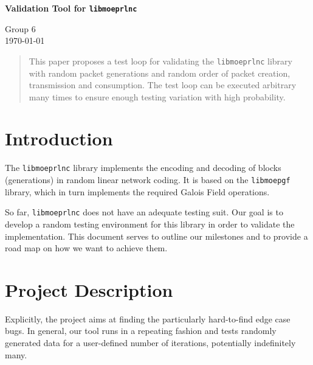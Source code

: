 \documentclass[a4paper,english,10pt]{tumarticle}
\begin{document}
\begin{center}
	\bfseries\Large Validation Tool for \texttt{libmoeprlnc}\\[.5\baselineskip]
\end{center}
\begin{center}
	\small Group 6\\ %
	\today
\end{center}


\setcounter{tocdepth}{1}
\renewcommand{\contentsname}{Anlagen}

\renewcommand{\emph}[1]{%
	\textcolor{TUMBlue}{#1}%
}


\renewcommand{\abstractname}{Abstract}
\begin{abstract}
\setlength{\parindent}{0pt}
\noindent%
\footnotesize

This paper proposes a test loop for validating the \texttt{libmoeprlnc} library with random packet generations and random order of packet creation, transmission and consumption. The test loop can be executed arbitrary many times to ensure enough testing variation with high probability.

\end{abstract}

\section{Introduction}

The \texttt{libmoeprlnc} library implements the encoding and decoding of blocks (generations) in
random linear network coding. It is based on the \texttt{libmoepgf} library, which in turn
implements the required Galois Field operations.

So far, \texttt{libmoeprlnc} does not have an adequate testing suit. Our goal is to develop a
random testing environment for this library in order to validate the
implementation. This document serves to outline our milestones and to provide a road map on how we
want to achieve them.

\section{Project Description}\label{sec:pd}
Explicitly, the project aims at finding the particularly hard-to-find edge case bugs. In general, our tool runs in a repeating fashion and tests randomly generated data for a user-defined number of iterations, potentially indefinitely many.
\end{document}
